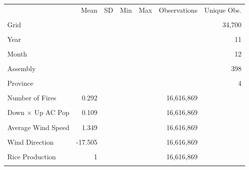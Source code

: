 \begin{tabular}{lrrrrrr}
\toprule
 & Mean & SD & Min & Max & Observations & Unique Obs.\\\\
\midrule
Grid &  &  &  &  &  & 34,700\\\\
Year &  &  &  &  &  & 11\\\\
Month &  &  &  &  &  & 12\\\\
Assembly &  &  &  &  &  & 398\\\\
Province &  &  &  &  &  & 4\\\\
Number of Fires & 0.292 &  &  &  & 16,616,869 & \\\\
Down $\times$ Up AC Pop & 0.109 &  &  &  & 16,616,869 & \\\\
Average Wind Speed & 1.349 &  &  &  & 16,616,869 & \\\\
Wind Direction & -17.505 &  &  &  & 16,616,869 & \\\\
Rice Production & 1 &  &  &  & 16,616,869 & \\\\
\bottomrule
\end{tabular}
